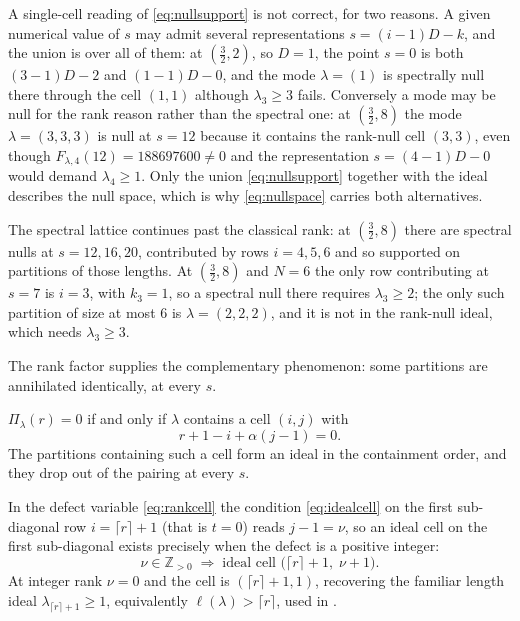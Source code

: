 \documentclass[11pt,letterpaper]{article}
\newcommand{\Zint}{\mathbb{Z}}
\begin{document}
A single-cell reading of \eqref{eq:nullsupport} is not correct, for two
reasons. A given numerical value of $s$ may
admit several representations $s=(i-1)D-k$, and the union is over all of them:
at $(\tfrac32,2)$, so $D=1$, the point $s=0$ is both $(3-1)D-2$ and $(1-1)D-0$,
and the mode $\lambda=(1)$ is spectrally null there through the cell $(1,1)$
although $\lambda_3\ge3$ fails. Conversely a mode may be null for the rank
reason rather than the spectral one: at $(\tfrac32,8)$ the mode
$\lambda=(3,3,3)$ is null at $s=12$ because it contains the rank-null cell
$(3,3)$, even though $F_{\lambda,4}(12)=188697600\ne0$ and the representation
$s=(4-1)D-0$ would demand $\lambda_4\ge1$. Only the union
\eqref{eq:nullsupport} together with the ideal describes the null space, which is
why \eqref{eq:nullspace} carries both alternatives.

The spectral lattice continues past the classical rank: at $(\tfrac32,8)$ there
are spectral nulls at $s=12,16,20$, contributed by rows $i=4,5,6$ and so
supported on partitions of those lengths. At $(\tfrac32,8)$ and $N=6$ the only
row contributing at $s=7$ is $i=3$, with $k_3=1$, so a spectral null there
requires $\lambda_3\ge2$; the only such partition of size at most $6$ is
$\lambda=(2,2,2)$, and it is not in the rank-null ideal, which needs
$\lambda_3\ge3$.


The rank factor supplies the complementary phenomenon: some partitions are
annihilated identically, at every $s$.

\begin{lemma}
\label{lem:ideal}
$\Pi_\lambda(r)=0$ if and only if $\lambda$ contains a cell $(i,j)$ with
\begin{equation}
  r+1-i+\alpha(j-1)=0.
  \label{eq:idealcell}
\end{equation}
The partitions containing such a cell form an ideal in the containment order,
and they drop out of the pairing at every $s$.
\end{lemma}

In the defect variable \eqref{eq:rankcell} the condition \eqref{eq:idealcell} on
the first sub-diagonal row $i=\lceil r\rceil+1$ (that is $t=0$) reads $j-1=\nu$,
so an ideal cell on the first sub-diagonal exists precisely when the defect is a
positive integer:
\begin{equation}
  \nu\in\Zint_{>0}\;\Longrightarrow\;\text{ideal cell }
  \bigl(\lceil r\rceil+1,\;\nu+1\bigr).
  \label{eq:idealnu}
\end{equation}
At integer rank $\nu=0$ and the cell is $(\lceil r\rceil+1,1)$, recovering the
familiar length ideal $\lambda_{\lceil r\rceil+1}\ge1$, equivalently
$\ell(\lambda)>\lceil r\rceil$, used in .
\end{document}
